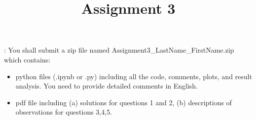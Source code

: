 \documentclass{exam}
\title{Assignment 3}
\date{}
\begin{document}
\maketitle
\thispagestyle{headandfoot}

\begin{center}
  {}
\end{center}
\vspace{.5cm}


\vspace{10pt}
: 
You shall submit a zip file named Assignment3\_LastName\_FirstName.zip which contains:

\begin{itemize}
  \item python files (.ipynb or .py) including all the code, comments, plots, and result analysis. You need to provide detailed comments in English.
   \item pdf file including (a) solutions for questions 1 and 2, (b) descriptions of observations for questions 3,4,5. 
\end{itemize}
\end{document}
